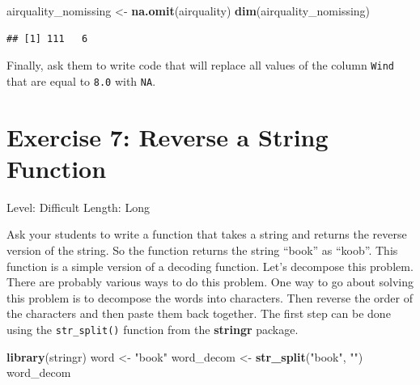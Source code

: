 \documentclass[]{book}
\newenvironment{Shaded}{\begin{snugshade}}{\end{snugshade}}
\newcommand{\FloatTok}[1]{\textcolor[rgb]{0.00,0.00,0.81}{#1}}
\newcommand{\KeywordTok}[1]{\textcolor[rgb]{0.13,0.29,0.53}{\textbf{#1}}}
\newcommand{\NormalTok}[1]{#1}
\newcommand{\OperatorTok}[1]{\textcolor[rgb]{0.81,0.36,0.00}{\textbf{#1}}}
\newcommand{\OtherTok}[1]{\textcolor[rgb]{0.56,0.35,0.01}{#1}}
\newcommand{\StringTok}[1]{\textcolor[rgb]{0.31,0.60,0.02}{#1}}
\begin{document}
\begin{Shaded}
\begin{Highlighting}[]
\NormalTok{airquality_nomissing <-}\StringTok{ }\KeywordTok{na.omit}\NormalTok{(airquality)}
\KeywordTok{dim}\NormalTok{(airquality_nomissing)}
\end{Highlighting}
\end{Shaded}

\begin{verbatim}
## [1] 111   6
\end{verbatim}

Finally, ask them to write code that will replace all values of the column \texttt{Wind} that are equal to \texttt{8.0} with \texttt{NA}.

\begin{Shaded}
\end{Shaded}

\hypertarget{exercise-7-reverse-a-string-function}{%
\section*{Exercise 7: Reverse a String Function}\label{exercise-7-reverse-a-string-function}}

Level: Difficult
Length: Long

Ask your students to write a function that takes a string and returns the reverse version of the string. So the function returns the string ``book'' as ``koob''. This function is a simple version of a decoding function. Let's decompose this problem. There are probably various ways to do this problem. One way to go about solving this problem is to decompose the words into characters. Then reverse the order of the characters and then paste them back together. The first step can be done using the \texttt{str\_split()} function from the \textbf{stringr} package.

\begin{Shaded}
\begin{Highlighting}[]
\KeywordTok{library}\NormalTok{(stringr)}
\NormalTok{word <-}\StringTok{ "book"}
\NormalTok{word_decom <-}\StringTok{ }\KeywordTok{str_split}\NormalTok{(}\StringTok{"book"}\NormalTok{, }\StringTok{""}\NormalTok{)}
\NormalTok{word_decom}
\end{Highlighting}
\end{Shaded}
\end{document}
